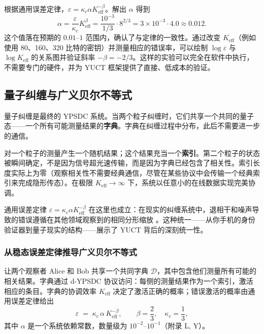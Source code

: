 \documentclass[12pt,a4paper]{article}
\theoremstyle{remark}
\newcommand{\Keff}{K_{\mathrm{eff}}}
\begin{document}
	根据通用误差定律，$\varepsilon = \kappa_c \alpha K_{\mathrm{eff}}^{-\beta}$。解出 $\alpha$ 得到
	\[
	\alpha = \frac{\varepsilon}{\kappa_c} K_{\mathrm{eff}}^{\beta} = \frac{10^{-3}}{1/3} \cdot 8^{2/3} = 3 \times 10^{-3} \cdot 4.0 \approx 0.012.
	\]
	这个值落在预期的 $0.01$–$1$ 范围内，确认了与定律的一致性。通过改变 $\Keff$（例如使用 80、160、320 比特的密钥）并测量相应的错误率，可以绘制 $\log \varepsilon$ 与 $\log \Keff$ 的关系图并验证斜率 $-\beta = -2/3$。这样的实验可以完全在软件中执行，不需要专门的硬件，并为 YUCT 框架提供了直接、低成本的验证。
	
	\subsection{量子纠缠与广义贝尔不等式}
	
	量子纠缠是最终的 YPSDC 系统。当两个粒子纠缠时，它们共享一个共同的量子态——一个所有可能测量结果的\textbf{字典}。字典在纠缠过程中分布，此后不需要进一步的通信。
	
	对一个粒子的测量产生一个随机结果；这个结果充当一个\textbf{索引}。第二个粒子的状态被瞬间确定，不是因为信号超光速传输，而是因为字典已经包含了相关性。索引长度实际上为零（观察相关性不需要经典通信，尽管在某些协议中会传输一个经典索引来完成隐形传态）。在极限 $\Keff \to \infty$ 下，系统以任意小的在线数据实现完美协调。
	
	通用误差定律 $\varepsilon = \kappa_c \alpha K_{\mathrm{eff}}^{-\beta}$ 在这里也成立：在现实的纠缠系统中，退相干和噪声导致的错误遵循在其他领域观察到的相同分形缩放 \cite{AppendixG, AppendixS}。这种统一——从你手机的身份验证器到量子现实的结构——展示了 YUCT 背后的深刻统一性。
	
	\subsubsection{从稳态误差定律推导广义贝尔不等式}
	\label{subsec:bell-derivation}
	
	让两个观察者 Alice 和 Bob 共享一个共同字典 $\mathcal{D}$，其中包含他们测量所有可能的相关结果。字典通过 d-YPSDC 协议访问：每侧的测量结果作为一个索引，激活相应的条目。字典的协调效率 $K_{\mathrm{eff}}$ 决定了激活正确的概率；错误激活的概率由通用误差定律给出
	\begin{equation}
		\varepsilon \;=\; \kappa_c\,\alpha\,K_{\mathrm{eff}}^{-\beta},
		\qquad \beta = \frac{2}{3},\quad \kappa_c = \frac{1}{3},
		\label{eq:error-law-bell}
	\end{equation}
	其中 $\alpha$ 是一个系统依赖常数，数量级为 $10^{-2}$–$10^{-1}$（附录 L, Y）。
	
\end{document}
